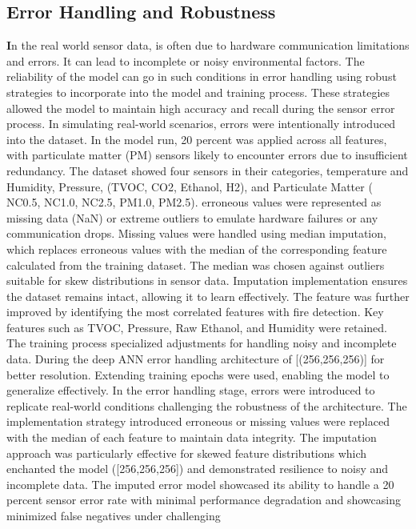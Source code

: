 \documentclass[conference]{IEEEtran}
\begin{document}
\subsection{Error Handling and Robustness}
\textbf 
In the real world sensor data, is often due to hardware
communication limitations and errors. It can lead to
incomplete or noisy environmental factors. The reliability
of the model can go in such conditions in error handling
using robust strategies to incorporate into the model and
training process. These strategies allowed the model to
maintain high accuracy and recall during the sensor error
process. In simulating real-world scenarios, errors were
intentionally introduced into the dataset. In the model run,
20 percent was applied across all features, with particulate
matter (PM) sensors likely to encounter errors due to
insufficient redundancy. The dataset showed four sensors in
their categories, temperature and Humidity, Pressure, (TVOC,
CO2, Ethanol, H2), and Particulate Matter ( NC0.5, NC1.0,
NC2.5, PM1.0, PM2.5). erroneous values were represented as
missing data (NaN) or extreme outliers to emulate hardware
failures or any communication drops. Missing values were
handled using median imputation, which replaces erroneous
values with the median of the corresponding feature
calculated from the training dataset. The median was chosen
against outliers suitable for skew distributions in sensor
data. Imputation implementation ensures the dataset remains
intact, allowing it to learn effectively. The feature was
further improved by identifying the most correlated features
with fire detection. Key features such as TVOC, Pressure,
Raw Ethanol, and Humidity were retained.    
The training process specialized adjustments for handling
noisy and incomplete data. During the deep ANN error
handling architecture of [(256,256,256)] for better
resolution. Extending training epochs were used, enabling
the model to generalize effectively. In the error handling
stage, errors were introduced to replicate real-world
conditions challenging the robustness of the architecture.
The implementation strategy introduced erroneous or missing
values were replaced with the median of each feature to
maintain data integrity. The imputation approach was
particularly effective for skewed feature distributions
which enchanted the model ([256,256,256]) and demonstrated
resilience to noisy and incomplete data. The imputed error
model showcased its ability to handle a 20 percent sensor
error rate with minimal performance degradation and
showcasing minimized false negatives under challenging
\end{document}
